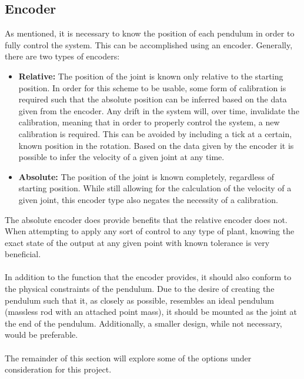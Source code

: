 \subsection{Encoder} %
\label{sub:encoder}
As mentioned, it is necessary to know the position of each pendulum in order to fully control the system.
This can be accomplished using an encoder.
Generally, there are two types of encoders:
\begin{itemize}
	\item \textbf{Relative:} The position of the joint is known only relative to the starting position.
	In order for this scheme to be usable, some form of calibration is required such that the absolute position can be inferred based on the data given from the encoder.
	Any drift in the system will, over time, invalidate the calibration, meaning that in order to properly control the system, a new calibration is required.
	This can be avoided by including a tick at a certain, known position in the rotation.
	Based on the data given by the encoder it is possible to infer the velocity of a given joint at any time.
	\item \textbf{Absolute:} The position of the joint is known completely, regardless of starting position.
	While still allowing for the calculation of the velocity of a given joint, this encoder type also negates the necessity of a calibration.
\end{itemize}
The absolute encoder does provide benefits that the relative encoder does not.
When attempting to apply any sort of control to any type of plant, knowing the exact state of the output at any given point with known tolerance is very beneficial.
\\~\\
In addition to the function that the encoder provides, it should also conform to the physical constraints of the pendulum.
Due to the desire of creating the pendulum such that it, as closely as possible, resembles an ideal pendulum (massless rod with an attached point mass), it should be mounted as the joint at the end of the pendulum.
Additionally, a smaller design, while not necessary, would be preferable.
\\~\\
The remainder of this section will explore some of the options under consideration for this project.
